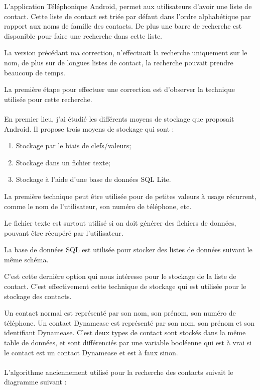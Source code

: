 L'application Téléphonique Android, permet aux utilisateurs d'avoir une liste de contact. Cette liste de contact est triée par défaut dans l'ordre alphabétique par rapport aux noms de famille des contacts. De plus une barre de recherche est disponible pour faire une recherche dans cette liste.

La version précédant ma correction, n'effectuait la recherche uniquement sur le nom, de plus sur de longues listes de contact, la recherche pouvait prendre beaucoup de temps.

La première étape pour effectuer une correction est d'observer la technique utilisée pour cette recherche.\\\\

En premier lieu, j'ai étudié les différents moyens de stockage que proposait Android. Il propose trois moyens de stockage qui sont :

\begin{enumerate}
	\item Stockage par le biais de clefs/valeurs;
	\item Stockage dans un fichier texte;
	\item Stockage à l'aide d'une base de données SQL Lite.
\end{enumerate}

La première technique peut être utilisée pour de petites valeurs à usage récurrent, comme le nom de l'utilisateur, son numéro de téléphone, etc.

Le fichier texte est surtout utilisé si on doit générer des fichiers de données, pouvant être récupéré par l'utilisateur.

La base de données SQL est utilisée pour stocker des listes de données suivant le même schéma.

C'est cette dernière option qui nous intéresse pour le stockage de la liste de contact. C'est effectivement cette technique de stockage qui est utilisée pour le stockage des contacts.

Un contact normal est représenté par son nom, son prénom, son numéro de téléphone. Un contact Dynamease est représenté par son nom, son prénom et son identifiant Dynamease. C'est deux types de contact sont stockés dans la même table de données, et sont différenciés par une variable booléenne qui est à vrai si le contact est un contact Dynamease et est à faux sinon.\\\\

L'algorithme anciennement utilisé pour la recherche des contacts suivait le diagramme suivant :


